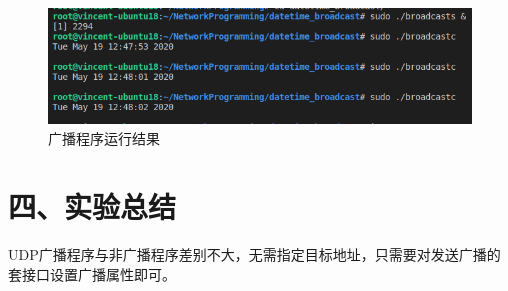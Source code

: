 \documentclass[UTF8]{ctexart}
\begin{document}
\begin{figure}[H]
\includegraphics[width=\textwidth]{pic/broadcast_result.PNG}
\caption{广播程序运行结果}
\end{figure}

\section*{四、实验总结}

UDP广播程序与非广播程序差别不大，无需指定目标地址，只需要对发送广播的套接口设置广播属性即可。
\end{document}
